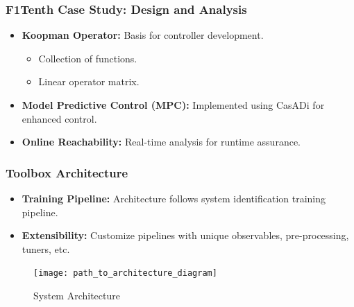\documentclass[shortpres,aspectratio=43]{beamer}
\begin{document}
\begin{frame}
\end{frame}

\begin{frame}
\frametitle{F1Tenth Case Study: Design and Analysis}
\begin{itemize}
    \item<1-> \textbf{Koopman Operator:} Basis for controller development.
    \begin{itemize}
        \item Collection of functions.
        \item Linear operator matrix.
    \end{itemize}
    \item<2-> \textbf{Model Predictive Control (MPC):} Implemented using CasADi for enhanced control.
    \item<3-> \textbf{Online Reachability:} Real-time analysis for runtime assurance.
\end{itemize}
\end{frame}

\begin{frame}
\frametitle{Toolbox Architecture}
\begin{itemize}
    \item<1-> \textbf{Training Pipeline:} Architecture follows system identification training pipeline.
    \item<2-> \textbf{Extensibility:} Customize pipelines with unique observables, pre-processing, tuners, etc.
\end{itemize}
\begin{figure}
  \centering
  \texttt{[image: path\_to\_architecture\_diagram]} %
  \caption{System Architecture}
\end{figure}
\end{frame}
\end{document}

